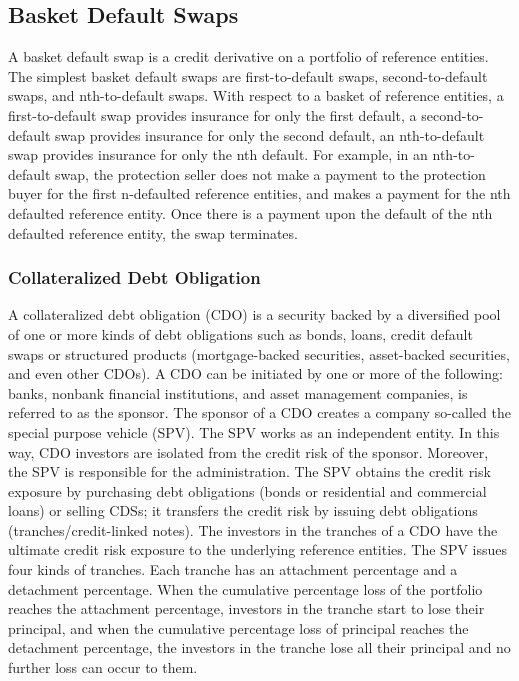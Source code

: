 \subsection{Basket Default Swaps}\label{basket-default-swaps}

A basket default swap is a credit derivative on a portfolio of reference
entities. The simplest basket default swaps are first-to-default swaps,
second-to-default swaps, and nth-to-default swaps. With respect to a
basket of reference entities, a first-to-default swap provides insurance
for only the first default, a second-to-default swap provides insurance
for only the second default, an nth-to-default swap provides insurance
for only the nth default. For example, in an nth-to-default swap, the
protection seller does not make a payment to the protection buyer for
the first n-defaulted reference entities, and makes a payment for the
nth defaulted reference entity. Once there is a payment upon the
default of the nth defaulted reference entity, the swap terminates.

\subsubsection{Collateralized Debt Obligation}\label{collateralized-debt-obligation}

A collateralized debt obligation (CDO) is a security backed by a
diversified pool of one or more kinds of debt obligations such as bonds,
loans, credit default swaps or structured products (mortgage-backed
securities, asset-backed securities, and even other CDOs). A CDO can be
initiated by one or more of the following: banks, nonbank financial
institutions, and asset management companies, is referred to as the
sponsor. The sponsor of a CDO creates a company so-called the special
purpose vehicle (SPV). The SPV works as an independent entity. In this
way, CDO investors are isolated from the credit risk of the sponsor.
Moreover, the SPV is responsible for the administration. The SPV obtains
the credit risk exposure by purchasing debt obligations (bonds or
residential and commercial loans) or selling CDSs; it transfers the
credit risk by issuing debt obligations (tranches/credit-linked notes).
The investors in the tranches of a CDO have the ultimate credit risk
exposure to the underlying reference entities. The SPV issues four kinds
of tranches. Each tranche has an attachment percentage and a detachment
percentage. When the cumulative percentage loss of the portfolio reaches
the attachment percentage, investors in the tranche start to lose their
principal, and when the cumulative percentage loss of principal reaches
the detachment percentage, the investors in the tranche lose all their
principal and no further loss can occur to them.

